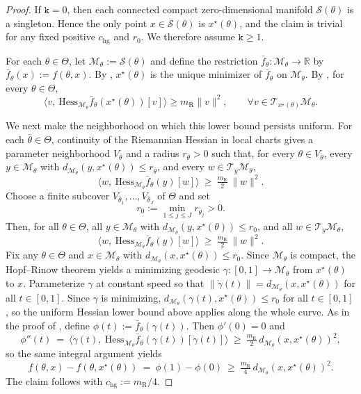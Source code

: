 \documentclass{article}
\theoremstyle{normaltheorem}
\newcommand{\dimk}{\texttt{k}}
\newcommand{\R}{\mathbb{R}}
\newcommand{\calS}{\mathcal{S}}
\begin{document}
\begin{proof}
If \(\dimk=0\), then each connected compact zero-dimensional manifold \(\calS(\theta)\) is a singleton. Hence the only
point \(x\in\calS(\theta)\) is \(x^\star(\theta)\), and the claim is trivial for any fixed positive
\(c_{\mathrm{hg}}\) and \(r_0\). We therefore assume \(\dimk\ge1\).

For each $\theta\in\Theta$, let $\mathcal M_\theta:=\calS(\theta)$ and define the restriction
$\bar f_\theta:\mathcal M_\theta\to\R$ by $\bar f_\theta(x):=f(\theta,x)$.
By , \(x^\star(\theta)\) is the unique minimizer of \(\bar f_\theta\) on \(\mathcal M_\theta\).
By , for every \(\theta\in\Theta\),
\[
\big\langle v,\ \mathrm{Hess}_{\mathcal M_\theta}\bar f_\theta(x^\star(\theta))[v]\big\rangle
\ge m_{\mathrm R}\|v\|^2,
\qquad
\forall v\in\mathcal T_{x^\star(\theta)}\mathcal M_\theta .
\]

We next make the neighborhood on which this lower bound persists uniform. For each \(\bar\theta\in\Theta\), continuity of
the Riemannian Hessian in local charts gives a parameter neighborhood \(V_{\bar\theta}\) and a radius
\(r_{\bar\theta}>0\) such that, for every \(\theta\in V_{\bar\theta}\), every
\(y\in\mathcal M_\theta\) with \(d_{\mathcal M_\theta}(y,x^\star(\theta))\le r_{\bar\theta}\), and every
\(w\in\mathcal T_y\mathcal M_\theta\),
\[
\big\langle w,\ \mathrm{Hess}_{\mathcal M_\theta}\bar f_\theta(y)[w]\big\rangle\ \ge\ \tfrac{m_{\mathrm R}}{2}\,\|w\|^2.
\]
Choose a finite subcover \(V_{\bar\theta_1},\ldots,V_{\bar\theta_J}\) of \(\Theta\) and set
\[
r_0:=\min_{1\le j\le J} r_{\bar\theta_j}>0.
\]
Then, for all $\theta\in\Theta$, all $y\in\mathcal M_\theta$ with $d_{\mathcal M_\theta}(y,x^\star(\theta))\le r_0$, and all $w\in\mathcal T_y\mathcal M_\theta$,
\[
\big\langle w,\ \mathrm{Hess}_{\mathcal M_\theta}\bar f_\theta(y)[w]\big\rangle\ \ge\ \tfrac{m_{\mathrm R}}{2}\,\|w\|^2.
\]
Fix any $\theta\in\Theta$ and $x\in\mathcal M_\theta$ with $d_{\mathcal M_\theta}(x,x^\star(\theta))\le r_0$.
Since $\mathcal M_\theta$ is compact, the Hopf--Rinow theorem yields a minimizing geodesic $\gamma:[0,1]\to\mathcal M_\theta$ from $x^\star(\theta)$ to $x$.
Parameterize $\gamma$ at constant speed so that $\|\dot\gamma(t)\|=d_{\mathcal M_\theta}(x,x^\star(\theta))$ for all $t\in[0,1]$.
Since \(\gamma\) is minimizing, \(d_{\mathcal M_\theta}(\gamma(t),x^\star(\theta))\le r_0\) for all \(t\in[0,1]\), so the
uniform Hessian lower bound above applies along the whole curve.
As in the proof of , define $\phi(t):=\bar f_\theta(\gamma(t))$.
Then $\phi'(0)=0$ and
\[
\phi''(t)
\ =\
\big\langle \dot\gamma(t),\ \mathrm{Hess}_{\mathcal M_\theta}\bar f_\theta(\gamma(t))[\dot\gamma(t)]\big\rangle
\ \ge\
\tfrac{m_{\mathrm R}}{2}\,d_{\mathcal M_\theta}(x,x^\star(\theta))^2,
\]
so the same integral argument yields
\[
f(\theta,x)-f(\theta,x^\star(\theta))
\ =\
\phi(1)-\phi(0)
\ \ge\
\tfrac{m_{\mathrm R}}{4}\,d_{\mathcal M_\theta}(x,x^\star(\theta))^2.
\]
The claim follows with $c_{\mathrm{hg}}:=m_{\mathrm R}/4$.
\end{proof}
\end{document}

